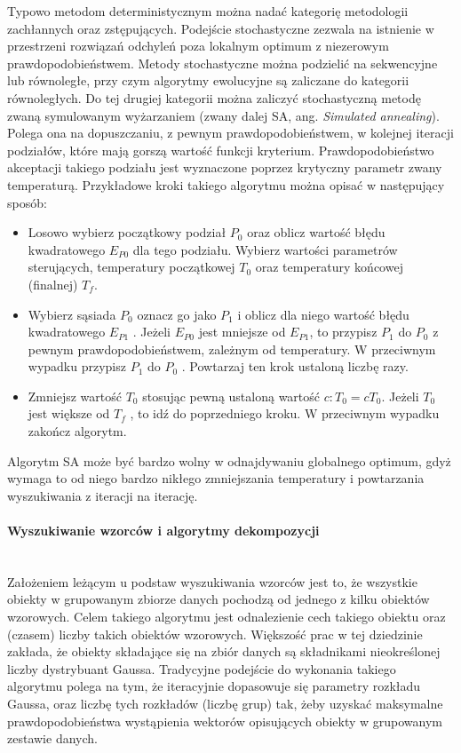 \documentclass{article}
\newcommand{\myparagraph}[1]{\paragraph{#1}\mbox{}\\}
\begin{document}
Typowo metodom deterministycznym można nadać kategorię metodologii zachłannych oraz zstępujących. Podejście stochastyczne zezwala na istnienie w przestrzeni rozwiązań odchyleń poza lokalnym optimum z niezerowym prawdopodobieństwem. Metody stochastyczne można podzielić na sekwencyjne lub równoległe, przy czym algorytmy ewolucyjne są zaliczane do kategorii równoległych. Do tej drugiej kategorii można zaliczyć stochastyczną metodę zwaną symulowanym wyżarzaniem (zwany dalej SA, ang. \textit{Simulated annealing}). Polega ona na dopuszczaniu, z pewnym prawdopodobieństwem, w kolejnej iteracji podziałów, które mają gorszą wartość funkcji kryterium. Prawdopodobieństwo akceptacji takiego podziału jest wyznaczone poprzez krytyczny parametr zwany temperaturą. Przykładowe kroki takiego algorytmu można opisać w następujący sposób:

\begin{itemize}
	\item Losowo wybierz początkowy podział $P_{0}$ oraz oblicz wartość błędu kwadratowego $E_{P0}$ dla tego podziału. Wybierz wartości parametrów sterujących, temperatury początkowej $T_{0}$ oraz temperatury końcowej (finalnej) $T_{f}$.
	\item Wybierz sąsiada $P_{0}$ oznacz go jako $P_{1}$ i oblicz dla niego wartość błędu kwadratowego $E_{P1}$ . Jeżeli $E_{P0}$ jest mniejsze od $E_{P1}$, to przypisz $P_{1}$ do $P_{0}$ z pewnym prawdopodobieństwem, zależnym od temperatury. W przeciwnym wypadku przypisz  $P_{1}$ do  $P_{0}$ . Powtarzaj ten krok ustaloną liczbę razy.
	\item Zmniejsz wartość $T_{0}$ stosując pewną ustaloną wartość $c: T_{0} = cT_{0}$. Jeżeli $T_{0}$ jest większe od $T_{f}$ , to idź do poprzedniego kroku. W przeciwnym wypadku zakończ algorytm.
\end{itemize}

Algorytm SA może być bardzo wolny w odnajdywaniu globalnego optimum, gdyż wymaga to od niego bardzo nikłego zmniejszania temperatury i powtarzania wyszukiwania z iteracji na iterację.

\myparagraph{Wyszukiwanie wzorców i algorytmy dekompozycji}

Założeniem leżącym u podstaw wyszukiwania wzorców jest to, że wszystkie obiekty w grupowanym zbiorze danych pochodzą od jednego z kilku obiektów wzorowych. Celem takiego algorytmu jest odnalezienie cech takiego obiektu oraz (czasem) liczby takich obiektów wzorowych. Większość prac w tej dziedzinie zakłada, że obiekty składające się na zbiór danych są składnikami nieokreślonej liczby dystrybuant Gaussa. Tradycyjne podejście do wykonania takiego algorytmu polega na tym, że iteracyjnie dopasowuje się parametry rozkładu Gaussa, oraz liczbę tych rozkładów (liczbę grup) tak, żeby uzyskać maksymalne prawdopodobieństwa wystąpienia wektorów opisujących obiekty w grupowanym zestawie danych.
\end{document}
